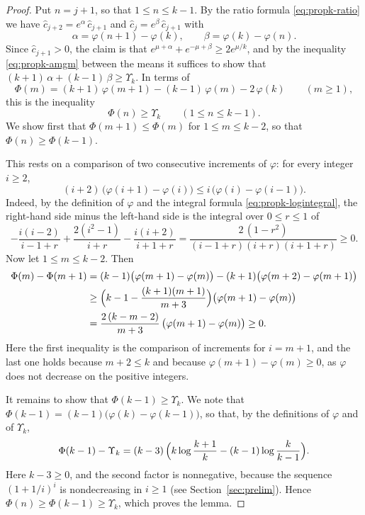 \documentclass{amsart}
\theoremstyle{definition}
\theoremstyle{remark}
\numberwithin{equation}{section}
\begin{document}
\begin{proof}
Put $n=j+1$, so that $1\le n\le k-1$. By the ratio formula \eqref{eq:propk-ratio} we have $\hat c_{j+2}=e^{\alpha}\,\hat c_{j+1}$ and $\hat c_{j}=e^{\beta}\,\hat c_{j+1}$ with
\[
\alpha=\varphi(n+1)-\varphi(k),\qquad\beta=\varphi(k)-\varphi(n).
\]
Since $\hat c_{j+1}>0$, the claim is that $e^{\mu+\alpha}+e^{-\mu+\beta}\ge 2e^{\mu/k}$, and by the inequality \eqref{eq:propk-amgm} between the means it suffices to show that $(k+1)\,\alpha+(k-1)\,\beta\ge\Upsilon_k$. In terms of
\[
\Phi(m)=(k+1)\,\varphi(m+1)-(k-1)\,\varphi(m)-2\,\varphi(k)\qquad(m\ge 1),
\]
this is the inequality
\[
\Phi(n)\ge\Upsilon_k\qquad(1\le n\le k-1).
\]
We show first that $\Phi(m+1)\le\Phi(m)$ for $1\le m\le k-2$, so that $\Phi(n)\ge\Phi(k-1)$.

This rests on a comparison of two consecutive increments of $\varphi$: for every integer $i\ge 2$,
\[
(i+2)\,\bigl(\varphi(i+1)-\varphi(i)\bigr)\le i\,\bigl(\varphi(i)-\varphi(i-1)\bigr).
\]
Indeed, by the definition of $\varphi$ and the integral formula \eqref{eq:propk-logintegral}, the right-hand side minus the left-hand side is the integral over $0\le r\le 1$ of
\[
-\frac{i(i-2)}{i-1+r}+\frac{2(i^2-1)}{i+r}-\frac{i(i+2)}{i+1+r}=\frac{2\,(1-r^2)}{(i-1+r)(i+r)(i+1+r)}\ge 0.
\]
Now let $1\le m\le k-2$. Then
\begin{align*}
\Phi(m)-\Phi(m+1)&=(k-1)\bigl(\varphi(m+1)-\varphi(m)\bigr)-(k+1)\bigl(\varphi(m+2)-\varphi(m+1)\bigr)\\
&\ge\Bigl(k-1-\frac{(k+1)(m+1)}{m+3}\Bigr)\bigl(\varphi(m+1)-\varphi(m)\bigr)\\
&=\frac{2\,(k-m-2)}{m+3}\,\bigl(\varphi(m+1)-\varphi(m)\bigr)\ge 0.
\end{align*}
Here the first inequality is the comparison of increments for $i=m+1$, and the last one holds because $m+2\le k$ and because $\varphi(m+1)-\varphi(m)\ge 0$, as $\varphi$ does not decrease on the positive integers.

It remains to show that $\Phi(k-1)\ge\Upsilon_k$. We note that $\Phi(k-1)=(k-1)\bigl(\varphi(k)-\varphi(k-1)\bigr)$, so that, by the definitions of $\varphi$ and of $\Upsilon_k$,
\[
\Phi(k-1)-\Upsilon_k=(k-3)\,\Bigl(k\log\frac{k+1}{k}-(k-1)\log\frac{k}{k-1}\Bigr).
\]
Here $k-3\ge 0$, and the second factor is nonnegative, because the sequence $(1+1/i)^{i}$ is nondecreasing in $i\ge 1$ (see Section~\ref{sec:prelim}). Hence $\Phi(n)\ge\Phi(k-1)\ge\Upsilon_k$, which proves the lemma.
\end{proof}
\end{document}
